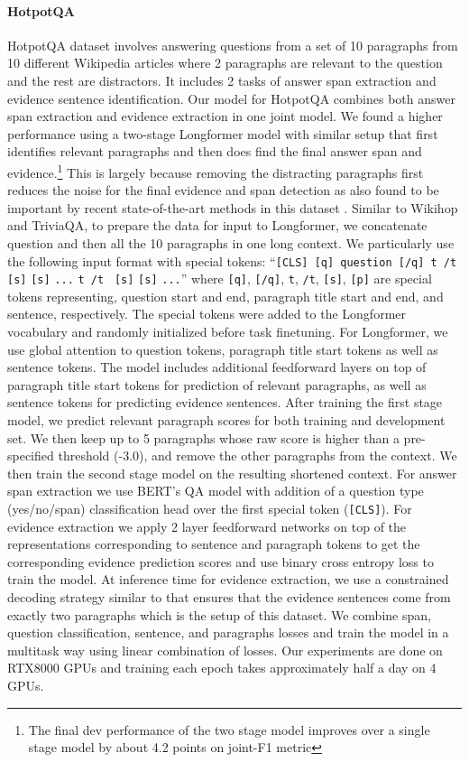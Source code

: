 \documentclass[11pt,a4paper]{article}
\newcommand{\model}{Longformer\xspace}
\begin{document}
\paragraph{HotpotQA}
HotpotQA dataset involves answering questions from a set of 10 paragraphs from 10 different Wikipedia articles where 2 paragraphs are relevant to the question and the rest are distractors. It includes 2 tasks of answer span extraction and evidence sentence identification.
Our model for HotpotQA combines both answer span extraction and evidence extraction in one joint model. 
We found a higher performance using a two-stage \model model with similar setup that first identifies relevant paragraphs and then does find the final answer span and evidence.\footnote{The final dev performance of the two stage model improves over a single stage model by about 4.2 points on joint-F1 metric}  This is largely because removing the distracting paragraphs first reduces the noise for the final evidence and span detection as also found to be important by recent state-of-the-art methods in this dataset \cite{hotpotqasota}.
Similar to Wikihop and TriviaQA, to prepare the data for input to \model, we concatenate question and then all the 10 paragraphs in one long context. We particularly use the following input format with special tokens: ``\texttt{[CLS] [q] question [/q] t  /t}  \texttt{[s]}  \texttt{[s]} \texttt{...} \texttt{t  /t }   \texttt{[s]}  \texttt{[s]} \texttt{...}'' where \texttt{[q]}, \texttt{[/q]}, \texttt{t}, \texttt{/t}, \texttt{[s]}, \texttt{[p]} are special tokens representing, question start and end, paragraph title start and end, and sentence, respectively. The special tokens were added to the \model vocabulary and randomly initialized before task finetuning. For \model, we use global attention to question tokens, paragraph title start tokens as well as sentence tokens. The model includes additional feedforward layers on top of paragraph title start tokens for prediction of relevant paragraphs, as well as sentence tokens for predicting evidence sentences. After training the first stage model, we predict relevant paragraph scores for both training and development set. We then keep up to 5 paragraphs whose raw score is higher than a pre-specified threshold (-3.0), and remove the other paragraphs from the context. We then train the second stage model on the resulting shortened context. For answer span extraction we use BERT's QA model \cite{bert} with addition of a question type (yes/no/span) classification head over the first special token (\texttt{[CLS]}). For evidence extraction we apply 2 layer feedforward networks on top of the representations corresponding to sentence and paragraph tokens to get the corresponding evidence prediction scores and use binary cross entropy loss to train the model. At inference time for evidence extraction, we use a constrained decoding strategy similar to \citet{quark2020} that ensures that the evidence sentences come from exactly two paragraphs which is the setup of this dataset. We combine span, question classification, sentence, and paragraphs losses and train the model in a multitask way using linear combination of losses. Our experiments are done on RTX8000 GPUs and training each epoch takes approximately half a day on 4 GPUs.
\end{document}
